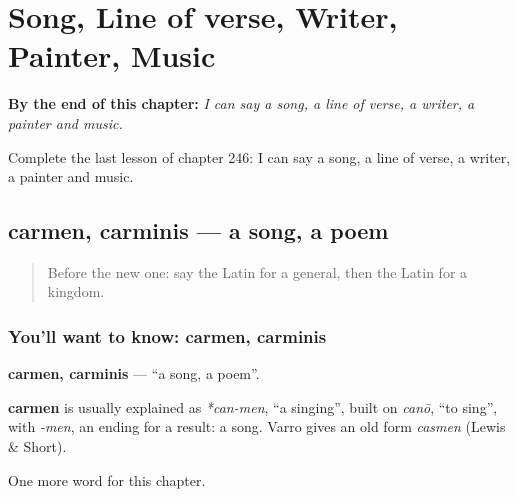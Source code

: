 
\chapter{Song, Line of verse, Writer, Painter, Music}
\label{ch:la-song-line-of-verse-writer-painter-music}

\begin{chapteropening}
\textbf{By the end of this chapter:} \emph{I can say a song, a line of verse, a writer, a painter and music.}

Complete the last lesson of chapter 246: I can say a song, a line of verse, a writer, a painter and music.
\end{chapteropening}

\section[carmen, carminis]{carmen, carminis — a song, a poem}

\label{lesson:LA-C246-carmen}



\begin{quote}
Before the new one: say the Latin for a general, then the Latin for a kingdom.
\end{quote}

\subsection*{You'll want to know: carmen, carminis}
\textbf{carmen, carminis} — \textquotedblleft{}a song, a poem\textquotedblright{}.

\begin{cousinweb}
\textbf{carmen} is usually explained as \emph{*can-men}, \textquotedblleft{}a singing\textquotedblright{}, built on \emph{canō}, \textquotedblleft{}to sing\textquotedblright{}, with \emph{-men}, an ending for a result: a song. Varro gives an old form \emph{casmen} (Lewis \& Short).
\end{cousinweb}

\begin{grammarlens}[title={What you've built}]
One more word for this chapter.
\end{grammarlens}

